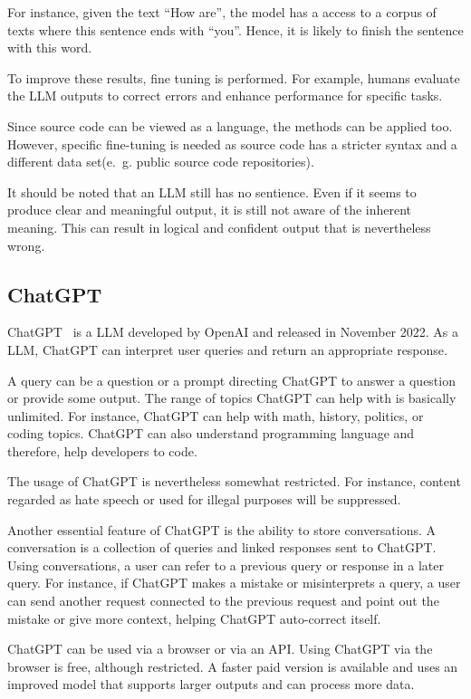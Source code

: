 For instance, given the text \enquote{How are}, the model  has a access to a corpus of texts where this sentence ends with \enquote{you}. Hence, it is likely to finish the sentence with this word. 

To improve these results, fine tuning is performed.  For example, humans evaluate the \ac{LLM} outputs to correct errors and enhance performance for specific tasks.



Since source code can be viewed as a language, the methods can be applied too. However, specific fine-tuning is needed as source code  has a stricter syntax and a different data set(e.~g. public source code repositories).

It should be noted that an \ac{LLM} still has no sentience. Even if it seems to produce clear and meaningful output, it is still not aware of the inherent meaning. This can result in logical and confident output that is nevertheless wrong.~\cite{Amaratunga2023}


\subsection{ChatGPT}
\label{sec:chatgpt}


ChatGPT~\cite{ChatGPT_url} is a \ac{LLM} developed by OpenAI and released in November 2022. As a \ac{LLM}, ChatGPT can interpret user queries and return an appropriate response. 

A query can be a question or a prompt directing ChatGPT to answer a question or provide some output. The range of topics ChatGPT can help with is basically unlimited. For instance, ChatGPT can help with math, history, politics, or coding topics. ChatGPT can also understand programming language and therefore, help developers to code.  

The usage of ChatGPT is nevertheless somewhat restricted. For instance, content regarded as hate speech or used for illegal purposes will be suppressed.

Another essential feature of ChatGPT is the ability to store conversations. A conversation is a collection of queries and linked responses sent to ChatGPT. Using conversations, a user can refer to a previous query or response in a later query. For instance, if ChatGPT makes a mistake or misinterprets a query, a user can send another request connected to the previous request and point out the mistake or give more context, helping ChatGPT auto-correct itself. 

ChatGPT can be used via a browser or via an \ac{API}. Using ChatGPT via the browser is free, although restricted. A faster paid version is available and uses an improved model that supports larger outputs and can process more data.

